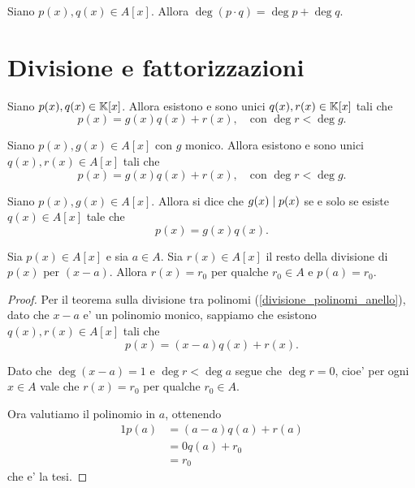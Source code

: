 \begin{proposition}\label{grado_prodotto_somma_gradi}
    Siano $p(x), q(x) \in A[x]$. Allora $\deg (p \cdot q) = \deg p + \deg q$.
\end{proposition}

\section{Divisione e fattorizzazioni}

\begin{theorem}
    Siano $p(x), q(x) \in \mathbb{K}[x]$. Allora esistono e sono unici $q(x), r(x) \in \mathbb{K}[x]$ tali che \begin{equation}
        p(x) = g(x)q(x) + r(x), \quad \text{con } \deg r < \deg g.
    \end{equation} 
\end{theorem}

\begin{proposition}\label{divisione_polinomi}
    Siano $p(x), g(x) \in A[x]$ con $g$ monico. Allora esistono e sono unici $q(x), r(x) \in A[x]$ tali che \begin{equation}
        p(x) = g(x)q(x) + r(x), \quad \text{con } \deg r < \deg g.
    \end{equation} 
\end{proposition}

\begin{definition}\label{divisione_polinomi_anello}
    Siano $p(x), g(x) \in A[x]$. Allora si dice che $g(x) \mid p(x)$ se e solo se esiste $q(x) \in A[x]$ tale che \[
        p(x) = g(x)q(x).    
    \]
\end{definition}

\begin{proposition}\label{resto_uguale_valutazione_nel_punto}
    Sia $p(x) \in A[x]$ e sia $a \in A$. Sia $r(x) \in A[x]$ il resto della divisione di $p(x)$ per $(x-a)$. Allora $r(x) = r_0$ per qualche $r_0 \in A$ e $p(a) = r_0$.
\end{proposition}
\begin{proof}
    Per il teorema sulla divisione tra polinomi (\ref{divisione_polinomi_anello}), dato che $x-a$ e' un polinomio monico, sappiamo che esistono $q(x), r(x) \in A[x]$ tali che \[
        p(x) = (x-a)q(x) + r(x).
    \]

    Dato che $\deg (x - a) = 1$ e $\deg r < \deg a$ segue che $\deg r = 0$, cioe' per ogni $x \in A$ vale che $r(x) = r_0$ per qualche $r_0 \in A$.

    Ora valutiamo il polinomio in $a$, ottenendo \begin{alignat*}
        {1}
        p(a) &= (a-a)q(a) + r(a)\\
        &= 0q(a) + r_0\\
        &= r_0
    \end{alignat*}
    che e' la tesi.
\end{proof}

